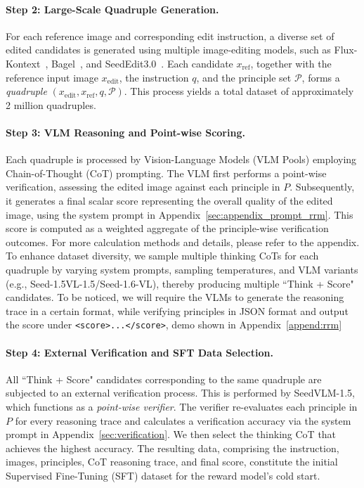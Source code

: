 \paragraph{Step 2: Large-Scale Quadruple Generation.}
For each reference image and corresponding edit instruction, a diverse set of edited candidates is generated using multiple image-editing models, such as Flux-Kontext~\citep{blackforestlabs_flux}, Bagel~\citep{deng2025emerging}, and SeedEdit3.0~\citep{wang2025seededit}. Each candidate $x_{\mathrm{ref}}$, together with the reference input image $x_{\mathrm{edit}}$, the instruction $q$, and the principle set $\mathcal{P}$, forms a \emph{quadruple} $(x_{\mathrm{edit}}, x_{\mathrm{ref}}, q, \mathcal{P})$. This process yields a total dataset of approximately 2 million quadruples.

\vspace{-1.0em}
\paragraph{Step 3: VLM Reasoning and Point-wise Scoring.}
Each quadruple is processed by Vision-Language Models (VLM Pools) employing Chain-of-Thought (CoT) prompting. The VLM first performs a point-wise verification, assessing the edited image against each principle in $P$. Subsequently, it generates a final scalar score representing the overall quality of the edited image, using the system prompt in Appendix~\ref{sec:appendix_prompt_rrm}. This score is computed as a weighted aggregate of the principle-wise verification outcomes. For more calculation methods and details, please refer to the appendix.
To enhance dataset diversity, we sample multiple thinking CoTs for each quadruple by varying system prompts, sampling temperatures, and VLM variants (e.g., Seed-1.5VL-1.5/Seed-1.6-VL), thereby producing multiple ``Think + Score" candidates.
To be noticed, we will require the VLMs to generate the reasoning trace in a certain format, while verifying principles in JSON format and output the score under \texttt{<score>...</score>}, demo shown in Appendix~\ref{append:rrm}

\paragraph{Step 4: External Verification and SFT Data Selection.}
All ``Think + Score" candidates corresponding to the same quadruple are subjected to an external verification process. This is performed by SeedVLM-1.5, which functions as a \emph{point-wise verifier}. The verifier re-evaluates each principle in $P$ for every reasoning trace and calculates a verification accuracy via the system prompt in Appendix~\ref{sec:verification}. We then select the thinking CoT that achieves the highest accuracy. The resulting data, comprising the instruction, images, principles, CoT reasoning trace, and final score, constitute the initial Supervised Fine-Tuning (SFT) dataset for the reward model's cold start.

